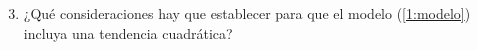 \documentclass[../main.tex]{subfiles}
\begin{document}
    \begin{enunciado}
    	\begin{enumerate}
            \setcounter{enumi}{2}
    		\item ¿Qué consideraciones hay que establecer para que el modelo (\ref{1:modelo}) incluya una tendencia cuadrática?
    	\end{enumerate}

    \end{enunciado}
    
    \begin{demostracion}
    	
    \end{demostracion}
    \vspace{1em}
\end{document}
